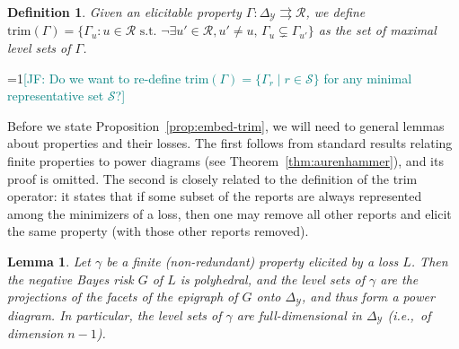 \documentclass[12pt]{article}
\newcommand{\Comments}{1}
\newcommand{\mynote}[2]{\ifnum\Comments=1\textcolor{#1}{#2}\fi}
\newcommand{\mytodo}[2]{\ifnum\Comments=1%
  \todo[linecolor=#1!80!black,backgroundcolor=#1,bordercolor=#1!80!black]{#2}\fi}
\newcommand{\jessie}[1]{\mynote{teal}{[JF: #1]}}
\newcommand{\btw}[1]{\mytodo{gray!20!white}{BTW: #1}}%
\newcommand{\simplex}{\Delta_\Y}
\newcommand{\R}{\mathcal{R}}
\newcommand{\Sc}{\mathcal{S}}
\newcommand{\Y}{\mathcal{Y}}
\newcommand{\toto}{\rightrightarrows}
\newcommand{\trim}{\mathrm{trim}}
\newtheorem{lemma}{Lemma}
\newtheorem{definition}{Definition}
\begin{document}
\begin{definition}\label{def:trim}
  Given an elicitable property $\Gamma:\simplex \toto\R$, we define $\trim(\Gamma) = \{\Gamma_u : u \in \R \text{ s.t. } \neg\exists u'\in\R,u'\neq u,\, \Gamma_u \subsetneq \Gamma_{u'}\}$ as the set of maximal level sets of $\Gamma$.
\end{definition}
\jessie{Do we want to re-define $\trim(\Gamma) = \{\Gamma_r \mid r \in \Sc\}$ for any minimal representative set $\Sc$?}



Before we state Proposition~\ref{prop:embed-trim}, we will need to general lemmas about properties and their losses.
The first follows from standard results relating finite properties to power diagrams (see Theorem~\ref{thm:aurenhammer}), and its proof is omitted.
The second is closely related to the definition of the trim operator: it states that if some subset of the reports are always represented among the minimizers of a loss, then one may remove all other reports and elicit the same property (with those other reports removed).

\begin{lemma}\label{lem:finite-full-dim}
  Let $\gamma$ be a finite (non-redundant) property elicited by a loss $L$.
  Then the negative Bayes risk $G$ of $L$ is polyhedral, and the level sets of $\gamma$ are the projections of the facets of the epigraph of $G$ onto $\simplex$, and thus form a power diagram.
  In particular, the level sets of $\gamma$ are full-dimensional in $\simplex$ (i.e.,\ of dimension $n-1$).
\end{lemma}
\end{document}
